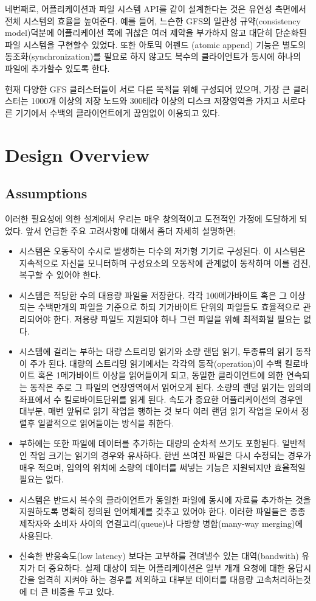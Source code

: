 \documentclass[twocolumn]{article}
\newcommand{\bi}{\begin{itemize}}
\newcommand{\ei}{\end{itemize}}
\newcommand{\ii}{\item}
\begin{document}
  네번째로, 어플리케이션과 파일 시스템 API를 같이 설계한다는 것은 유연성 측면에서 전체 시스템의 효율을 높여준다.  예를 들어, 느슨한 GFS의 일관성 규약(consistency model)덕분에  어플리케이션 쪽에 귀찮은 여러 제약을 부가하지 않고 대단히 단순화된 파일 시스템을 구현할수 있었다.  또한 아토믹 어펜드 (atomic append) 기능은 별도의 동조화(synchronization)를 필요로 하지 않고도 복수의 클라이언트가 동시에 하나의 파일에 추가할수 있도록 한다.

  현재 다양한 GFS 클러스터들이 서로 다른 목적을 위해 구성되어 있으며, 가장 큰 클러스터는 1000개 이상의 저장 노드와 300테라 이상의 디스크 저장영역을 가지고 서로다른 기기에서 수백의 클라이언트에게 끊임없이 이용되고 있다.

\section{Design Overview}
\subsection{Assumptions}

 이러한 필요성에 의한 설계에서 우리는 매우 창의적이고 도전적인 가정에 도달하게 되었다.  앞서 언급한 주요 고려사항에 대해서 좀더 자세히 설명하면;
\bi
\ii 시스템은 오동작이 수시로 발생하는 다수의 저가형 기기로 구성된다.  이 시스템은 지속적으로 자신을 모니터하며 구성요소의 오동작에 관계없이 동작하며 이를 검진, 복구할 수 있어야 한다.
\ii 시스템은 적당한 수의 대용량 파일을 저장한다.  각각 100메가바이트 혹은 그 이상되는 수백만개의 파일을 기준으로 하되 기가바이트 단위의 파일들도 효율적으로 관리되어야 한다.  저용량 파일도 지원되야 하나 그런 파일을 위해 최적화될 필요는 없다.
\ii 시스템에 걸리는 부하는 대량 스트리밍 읽기와 소량 랜덤 읽기, 두종류의 읽기 동작이 주가 된다.  대량의 스트리밍 읽기에서는 각각의 동작(operation)이 수백 킬로바이트 혹은 1메가바이트 이상을 읽어들이게 되고, 동일한 클라이언트에 의한 연속되는 동작은 주로 그 파일의 연장영역에서 읽어오게 된다.  소량의 랜덤 읽기는 임의의 좌표에서 수 킬로바이트단위를 읽게 된다.  속도가 중요한 어플리케이션의 경우엔 대부분, 매번 앞뒤로 읽기 작업을 행하는 것 보다 여러 랜덤 읽기 작업을 모아서 정렬후 일괄적으로 읽어들이는 방식을 취한다.
\ii 부하에는 또한 파일에 데이터를 추가하는 대량의 순차적 쓰기도 포함된다.  일반적인 작업 크기는 읽기의 경우와 유사하다.  한번 쓰여진 파일은 다시 수정되는 경우가 매우 적으며,  임의의 위치에 소량의 데이터를 써넣는 기능은 지원되지만 효율적일 필요는 없다.
\ii 시스템은 반드시 복수의 클라이언트가 동일한 파일에 동시에 자료를 추가하는 것을 지원하도록 명확히 정의된 언어체계를 갖추고 있어야 한다.  이러한 파일들은 종종 제작자와 소비자 사이의 연결고리(queue)나 다방향 병합(many-way merging)에 사용된다.
\ii 신속한 반응속도(low latency) 보다는 고부하를 견뎌낼수 있는 대역(bandwith) 유지가 더 중요하다. 실제 대상이 되는 어플리케이션은 일부 개개 요청에 대한 응답시간을 엄격히 지켜야 하는 경우를 제외하고 대부분 데이터를 대용량 고속처리하는것에 더 큰 비중을 두고 있다.
\ei
\end{document}
